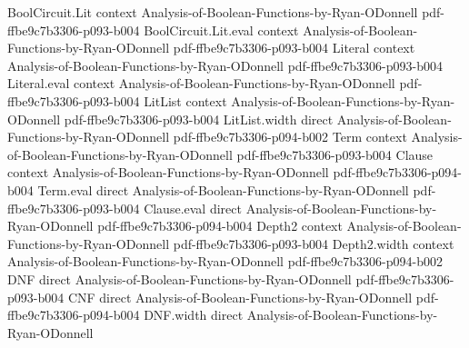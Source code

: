 \begin{theorem}
\leanok
{}
\proofstep
  {BoolCircuit.Lit}
  {context}
  {Analysis-of-Boolean-Functions-by-Ryan-ODonnell}
  {pdf-ffbe9c7b3306-p093-b004}
\proofstep
  {BoolCircuit.Lit.eval}
  {context}
  {Analysis-of-Boolean-Functions-by-Ryan-ODonnell}
  {pdf-ffbe9c7b3306-p093-b004}
\proofstep
  {Literal}
  {context}
  {Analysis-of-Boolean-Functions-by-Ryan-ODonnell}
  {pdf-ffbe9c7b3306-p093-b004}
\proofstep
  {Literal.eval}
  {context}
  {Analysis-of-Boolean-Functions-by-Ryan-ODonnell}
  {pdf-ffbe9c7b3306-p093-b004}
\proofstep
  {LitList}
  {context}
  {Analysis-of-Boolean-Functions-by-Ryan-ODonnell}
  {pdf-ffbe9c7b3306-p093-b004}
\proofstep
  {LitList.width}
  {direct}
  {Analysis-of-Boolean-Functions-by-Ryan-ODonnell}
  {pdf-ffbe9c7b3306-p094-b002}
\proofstep
  {Term}
  {context}
  {Analysis-of-Boolean-Functions-by-Ryan-ODonnell}
  {pdf-ffbe9c7b3306-p093-b004}
\proofstep
  {Clause}
  {context}
  {Analysis-of-Boolean-Functions-by-Ryan-ODonnell}
  {pdf-ffbe9c7b3306-p094-b004}
\proofstep
  {Term.eval}
  {direct}
  {Analysis-of-Boolean-Functions-by-Ryan-ODonnell}
  {pdf-ffbe9c7b3306-p093-b004}
\proofstep
  {Clause.eval}
  {direct}
  {Analysis-of-Boolean-Functions-by-Ryan-ODonnell}
  {pdf-ffbe9c7b3306-p094-b004}
\proofstep
  {Depth2}
  {context}
  {Analysis-of-Boolean-Functions-by-Ryan-ODonnell}
  {pdf-ffbe9c7b3306-p093-b004}
\proofstep
  {Depth2.width}
  {context}
  {Analysis-of-Boolean-Functions-by-Ryan-ODonnell}
  {pdf-ffbe9c7b3306-p094-b002}
\proofstep
  {DNF}
  {direct}
  {Analysis-of-Boolean-Functions-by-Ryan-ODonnell}
  {pdf-ffbe9c7b3306-p093-b004}
\proofstep
  {CNF}
  {direct}
  {Analysis-of-Boolean-Functions-by-Ryan-ODonnell}
  {pdf-ffbe9c7b3306-p094-b004}
\proofstep
  {DNF.width}
  {direct}
  {Analysis-of-Boolean-Functions-by-Ryan-ODonnell}

\end{theorem}
